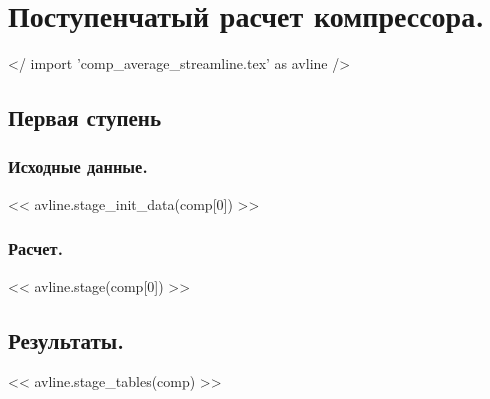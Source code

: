 \documentclass[a4paper,10pt]{article}
\begin{document}
    \section{Поступенчатый расчет компрессора.}

    </ import 'comp_average_streamline.tex' as avline />

    \subsection{Первая ступень}
    \subsubsection{Исходные данные.}

    << avline.stage_init_data(comp[0]) >>

    \subsubsection{Расчет.}

    << avline.stage(comp[0]) >>

    \subsection{Результаты.}

    << avline.stage_tables(comp) >>
\end{document}
